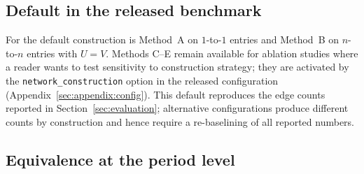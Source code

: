 \begin{algorithm}[H]
  \DontPrintSemicolon
  \caption{Network generation (after \citet{ivertowski2024apn},
    Algorithm~1).}
  \label{alg:network-gen}
\end{algorithm}

\subsection{Default in the released benchmark}
\label{sec:network:default}

For \bench{} the default construction is Method~A on $1$-to-$1$
entries and Method~B on $n$-to-$n$ entries with $U = V$.  Methods
C--E remain available for ablation studies where a reader wants to
test sensitivity to construction strategy; they are activated by the
\texttt{network\_construction} option in the released configuration
(Appendix~\ref{sec:appendix:config}).  This default reproduces the
edge counts reported in Section~\ref{sec:evaluation}; alternative
configurations produce different counts by construction and hence
require a re-baselining of all reported numbers.

\subsection{Equivalence at the period level}
\label{sec:network:equivalence}

